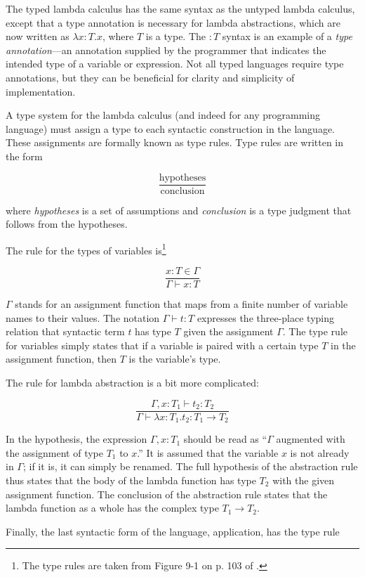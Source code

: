 \documentclass{article}
\begin{document}
The typed lambda calculus has the same syntax as the untyped lambda calculus, except that a type annotation is necessary for lambda abstractions, which are now written as $\lambda x: T . x$, where $T$ is a type. The $: T$ syntax is an example of a \textit{type annotation}---an annotation supplied by the programmer that indicates the intended type of a variable or expression. Not all typed languages require type annotations, but they can be beneficial for clarity and simplicity of implementation.

A type system for the lambda calculus (and indeed for any programming language) must assign a type to each syntactic construction in the language. These assignments are formally known as type rules. Type rules are written in the form

\[
\frac{\text{hypotheses}}
{\text{conclusion}}
\]

\noindent where \textit{hypotheses} is a set of assumptions and \textit{conclusion} is a type judgment that follows from the hypotheses.

The rule for the types of variables is\footnote{The type rules are taken from Figure 9-1 on p. 103 of \cite{types}.}

\[
\frac{x : T \in \Gamma}
{\Gamma \vdash x : T}
\]

$\Gamma$ stands for an assignment function that maps from a finite number of variable names to their values. The notation $\Gamma \vdash t : T$ expresses the three-place typing relation that syntactic term $t$ has type $T$ given the assignment $\Gamma$. The type rule for variables simply states that if a variable is paired with a certain type $T$ in the assignment function, then $T$ is the variable's type.

The rule for lambda abstraction is a bit more complicated:

\[
\frac{\Gamma, x : T_1 \vdash t_2 : T_2}
{\Gamma \vdash \lambda x : T_1 . t_2 : T_1 \to T_2}
\]

In the hypothesis, the expression $\Gamma, x : T_1$ should be read as ``$\Gamma$ augmented with the assignment of type $T_1$ to $x$.'' It is assumed that the variable $x$ is not already in $\Gamma$; if it is, it can simply be renamed. The full hypothesis of the abstraction rule thus states that the body of the lambda function has type $T_2$ with the given assignment function. The conclusion of the abstraction rule states that the lambda function as a whole has the complex type $T_1 \to T_2$.

Finally, the last syntactic form of the language, application, has the type rule
\end{document}
